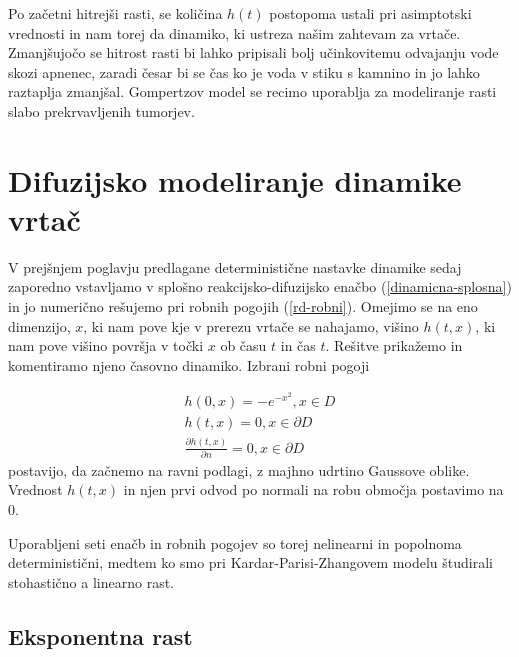 \documentclass[a4paper, twoside, 12pt]{book}
\begin{document}
Po začetni hitrejši rasti, se količina $h(t)$ postopoma ustali pri asimptotski vrednosti in nam torej da dinamiko, ki ustreza našim zahtevam za vrtače. Zmanjšujočo se hitrost rasti bi lahko pripisali bolj učinkovitemu odvajanju vode skozi apnenec, zaradi česar bi se čas ko je voda v stiku s kamnino in jo lahko raztaplja zmanjšal.
Gompertzov model se recimo uporablja za modeliranje rasti slabo prekrvavljenih tumorjev. \cite{wheldon1988mathematical}

    \section{Difuzijsko modeliranje dinamike vrtač}

V prejšnjem poglavju predlagane deterministične nastavke dinamike sedaj zaporedno vstavljamo v splošno reakcijsko-difuzijsko enačbo (\ref{dinamicna-splosna}) in jo numerično rešujemo pri robnih pogojih (\ref{rd-robni}). Omejimo se na eno dimenzijo, $x$, ki nam pove kje v prerezu vrtače se nahajamo, višino $h(t,x)$, ki nam pove višino površja v točki $x$ ob času $t$ in čas $t$. Rešitve prikažemo in komentiramo njeno časovno dinamiko. Izbrani robni pogoji

    \begin{equation}
      \begin{aligned}
        h(0,x) =  - e^{-x^2}, x \in D \\
        h(t,x) = 0, x \in \partial D \\
        \frac{\partial h(t,x)}{\partial n} = 0, x \in \partial D
      \end{aligned}
\label{rd-robni}
    \end{equation}
postavijo, da začnemo na ravni podlagi, z majhno udrtino Gaussove oblike. Vrednost $h(t,x)$ in njen prvi odvod po normali na robu območja postavimo na $0$.

Uporabljeni seti enačb in robnih pogojev so torej nelinearni in popolnoma deterministični, medtem ko smo pri Kardar-Parisi-Zhangovem modelu študirali stohastično a linearno rast.
    \subsection{Eksponentna rast}
\end{document}
